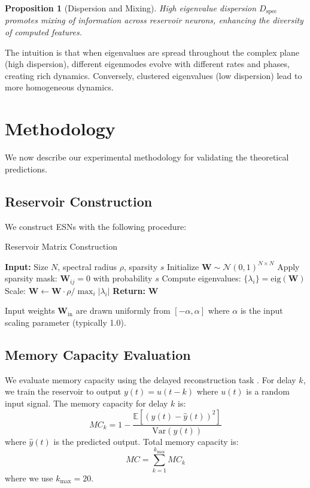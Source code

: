 \documentclass{article}
\newtheorem{proposition}[theorem]{Proposition}
\begin{document}
\begin{proposition}[Dispersion and Mixing]
High eigenvalue dispersion $D_{\text{spec}}$ promotes mixing of information across reservoir neurons, enhancing the diversity of computed features.
\end{proposition}

The intuition is that when eigenvalues are spread throughout the complex plane (high dispersion), different eigenmodes evolve with different rates and phases, creating rich dynamics. Conversely, clustered eigenvalues (low dispersion) lead to more homogeneous dynamics.

\section{Methodology}
\label{sec:methods}

We now describe our experimental methodology for validating the theoretical predictions.

\subsection{Reservoir Construction}

We construct ESNs with the following procedure:

\begin{algorithm}
\caption{Reservoir Matrix Construction}
\begin{algorithmic}
\STATE \textbf{Input:} Size $N$, spectral radius $\rho$, sparsity $s$
\STATE Initialize $\mathbf{W} \sim \mathcal{N}(0, 1)^{N \times N}$
\STATE Apply sparsity mask: $\mathbf{W}_{ij} = 0$ with probability $s$
\STATE Compute eigenvalues: $\{\lambda_i\} = \text{eig}(\mathbf{W})$
\STATE Scale: $\mathbf{W} \leftarrow \mathbf{W} \cdot \rho / \max_i |\lambda_i|$
\STATE \textbf{Return:} $\mathbf{W}$
\end{algorithmic}
\end{algorithm}

Input weights $\mathbf{W}_{\text{in}}$ are drawn uniformly from $[-\alpha, \alpha]$ where $\alpha$ is the input scaling parameter (typically 1.0).

\subsection{Memory Capacity Evaluation}

We evaluate memory capacity using the delayed reconstruction task \citep{jaeger2001}. For delay $k$, we train the reservoir to output $y(t) = u(t-k)$ where $u(t)$ is a random input signal. The memory capacity for delay $k$ is:
\begin{equation}
MC_k = 1 - \frac{\mathbb{E}[(y(t) - \hat{y}(t))^2]}{\text{Var}(y(t))}
\end{equation}
where $\hat{y}(t)$ is the predicted output. Total memory capacity is:
\begin{equation}
MC = \sum_{k=1}^{k_{\max}} MC_k
\end{equation}
where we use $k_{\max} = 20$.
\end{document}
